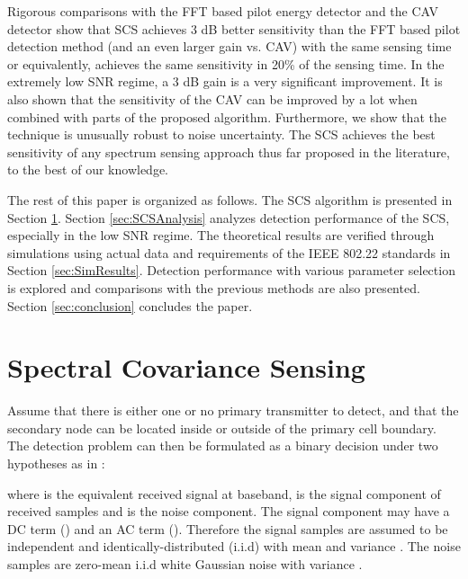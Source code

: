 \documentclass[draftclsnofoot,onecolumn,12pt]{IEEEtran}
\begin{document}
Rigorous comparisons with the FFT based pilot energy detector \cite{CorGho07} and the CAV detector \cite{ZenLia09} show that SCS achieves 3 dB better sensitivity than the FFT based pilot detection method (and an even larger gain vs. CAV) with the same sensing time or equivalently, achieves the same sensitivity in 20\% of the sensing time. In the extremely low SNR regime, a 3 dB gain is a very significant improvement.  It is also shown that the sensitivity of the CAV can be improved by a lot when combined with parts of the proposed algorithm.  Furthermore, we show that the technique is unusually robust to noise uncertainty. The SCS achieves the best sensitivity of any spectrum sensing approach thus far proposed in the literature, to the best of our knowledge.

The rest of this paper is organized as follows. The SCS algorithm is presented in Section \ref{sec:SensingAlgorithm}. Section \ref{sec:SCSAnalysis} analyzes detection performance of the SCS, especially in the low SNR regime. The theoretical results are verified through simulations using actual data and requirements of the IEEE 802.22 standards in Section \ref{sec:SimResults}. Detection performance with various parameter selection is explored and comparisons with the previous methods are also presented. Section \ref{sec:conclusion} concludes the paper.

\section{Spectral Covariance Sensing}
\label{sec:SensingAlgorithm}

Assume that there is either one or no primary transmitter to detect, and
that the secondary node can be located inside or outside of the primary cell boundary.
The detection problem can then be formulated as a binary decision under two hypotheses as in \cite{TanSah08,ZenLia09}:

where  is the equivalent received signal at baseband,  is the signal component of received samples and  is the noise component. The signal component  may have a DC term () and an AC term (). Therefore the signal samples are assumed to be independent and identically-distributed (i.i.d) with mean  and variance .
The noise samples  are zero-mean i.i.d white Gaussian noise with variance .
\end{document}
